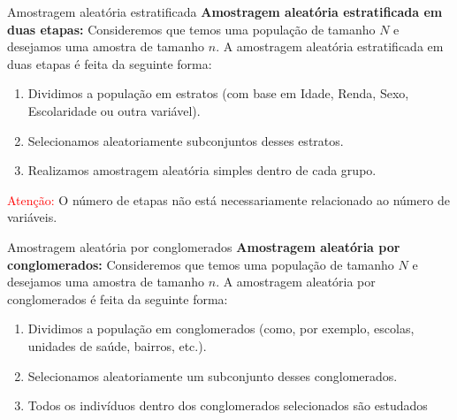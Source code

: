 \begin{frame}{Amostragem aleatória estratificada}
\textbf{Amostragem aleatória estratificada em duas etapas:} Consideremos que temos uma população de tamanho $N$ e desejamos uma amostra de tamanho $n$.
A amostragem aleatória estratificada em duas etapas é feita da seguinte forma:
\begin{enumerate}
    \item Dividimos a população em estratos (com base em Idade, Renda, Sexo, Escolaridade ou outra variável).
    \pause
    \item Selecionamos aleatoriamente subconjuntos desses estratos.  
    \pause
    \item Realizamos amostragem aleatória simples dentro de cada grupo.
\end{enumerate}
\pause
\textcolor{red}{Atenção:} O número de etapas não está necessariamente relacionado ao número de variáveis.
\end{frame}
\begin{frame}{Amostragem aleatória por conglomerados}
\textbf{Amostragem aleatória por conglomerados: }Consideremos que temos uma população de tamanho $N$ e desejamos uma amostra de tamanho $n$.
A amostragem aleatória por conglomerados é feita da seguinte forma:
\begin{enumerate}
    \item Dividimos a população em conglomerados (como, por exemplo, escolas, unidades de saúde, bairros, etc.).
    \pause
    \item Selecionamos aleatoriamente um subconjunto desses conglomerados.  
    \pause
    \item Todos os indivíduos dentro dos conglomerados selecionados são estudados
\end{enumerate}
\end{frame}

